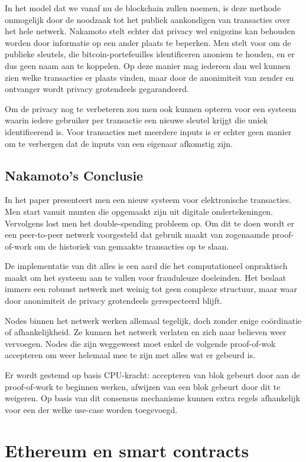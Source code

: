 	In het model dat we vanaf nu de blockchain zullen noemen, is deze methode onmogelijk door de noodzaak tot het publiek aankondigen van transacties over het hele netwerk.  Nakamoto stelt echter dat privacy wel enigszins kan behouden worden door informatie op een ander plaats te beperken. Men stelt voor om de publieke sleutels, die bitcoin-portefeuilles identificeren anoniem te houden, en er dus geen naam aan te koppelen. Op deze manier mag iedereen dan wel kunnen zien welke transacties er plaats vinden, maar door de anonimiteit van zender en ontvanger wordt privacy grotendeels gegarandeerd.
	
	Om de privacy nog te verbeteren zou men ook kunnen opteren voor een systeem waarin iedere gebruiker per transactie een nieuwe sleutel krijgt die uniek identificerend is. Voor transacties met meerdere inputs is er echter geen manier om te verbergen dat de inputs van een eigenaar afkomstig zijn.
	\subsection{Nakamoto’s Conclusie}
	In het paper presenteert men een nieuw systeem voor elektronische transacties. Men start vanuit munten die opgemaakt zijn uit digitale ondertekeningen. Vervolgens lost men het double-spending probleem op. Om dit te doen wordt er een peer-to-peer netwerk voorgesteld dat gebruik maakt van zogenaamde proof-of-work om de historiek van gemaakte transacties op te slaan. 
	
	De implementatie van dit alles is een aard die het computationeel onpraktisch maakt om het systeem aan te vallen voor frauduleuze doeleinden. Het beslaat immers een robuust netwerk met weinig tot geen complexe structuur, maar waar door anonimiteit de privacy grotendeels gerespecteerd blijft. 
	
	Nodes binnen het netwerk werken allemaal tegelijk, doch zonder enige coördinatie of afhankelijkheid. Ze kunnen het netwerk verlaten en zich naar believen weer vervoegen. Nodes die zijn weggeweest moet enkel de volgende proof-of-wok accepteren om weer helemaal mee te zijn met alles wat er gebeurd is. 
	
	Er wordt gestemd op basis CPU-kracht: accepteren van blok gebeurt door aan de proof-of-work te beginnen werken, afwijzen van een blok gebeurt door dit te weigeren. Op basis van dit consensus mechanisme kunnen extra regels afhankelijk voor een der welke use-case worden toegevoegd. 
\section{Ethereum en smart contracts}
\label{sec:ethereum-en-smart-contracts}
